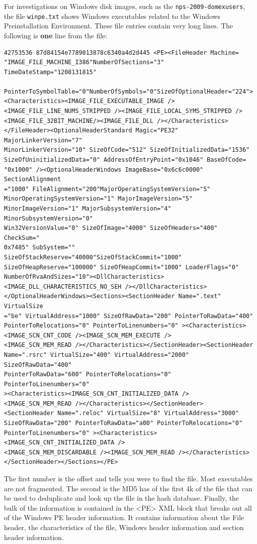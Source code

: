 For investigations on Windows disk images, such as the \texttt{nps-2009-domexusers}, the file \texttt{winpe.txt} shows Windows executables related to the Windows Preinstallation Environment. These file entries contain very long lines. The following is \textbf{one} line from the file:
\lstset{style=customfile}
\begin{lstlisting}
42753536 87d84154e7789013878c6340a4d2d445 <PE><FileHeader Machine=
"IMAGE_FILE_MACHINE_I386"NumberOfSections="3" TimeDateStamp="1208131815"
 PointerToSymbolTable="0"NumberOfSymbols="0"SizeOfOptionalHeader="224">
<Characteristics><IMAGE_FILE_EXECUTABLE_IMAGE />
<IMAGE_FILE_LINE_NUMS_STRIPPED /><IMAGE_FILE_LOCAL_SYMS_STRIPPED />
<IMAGE_FILE_32BIT_MACHINE/><IMAGE_FILE_DLL /></Characteristics>
</FileHeader><OptionalHeaderStandard Magic="PE32" MajorLinkerVersion="7" 
MinorLinkerVersion="10" SizeOfCode="512" SizeOfInitializedData="1536" 
SizeOfUninitializedData="0" AddressOfEntryPoint="0x1046" BaseOfCode=
"0x1000" /><OptionalHeaderWindows ImageBase="0x6c6c0000" SectionAlignment
="1000" FileAlignment="200"MajorOperatingSystemVersion="5" 
MinorOperatingSystemVersion="1" MajorImageVersion="5" 
MinorImageVersion="1" MajorSubsystemVersion="4" MinorSubsystemVersion="0" 
Win32VersionValue="0" SizeOfImage="4000" SizeOfHeaders="400" CheckSum="
0x7485" SubSystem="" SizeOfStackReserve="40000"SizeOfStackCommit="1000"
SizeOfHeapReserve="100000" SizeOfHeapCommit="1000" LoaderFlags="0"
NumberOfRvaAndSizes="10"><DllCharacteristics>
<IMAGE_DLL_CHARACTERISTICS_NO_SEH /></DllCharacteristics>
</OptionalHeaderWindows><Sections><SectionHeader Name=".text" VirtualSize
="be" VirtualAddress="1000" SizeOfRawData="200" PointerToRawData="400" 
PointerToRelocations="0" PointerToLinenumbers="0" ><Characteristics>
<IMAGE_SCN_CNT_CODE /><IMAGE_SCN_MEM_EXECUTE />
<IMAGE_SCN_MEM_READ /></Characteristics></SectionHeader><SectionHeader 
Name=".rsrc" VirtualSize="400" VirtualAddress="2000" SizeOfRawData="400" 
PointerToRawData="600" PointerToRelocations="0" PointerToLinenumbers="0"
><Characteristics><IMAGE_SCN_CNT_INITIALIZED_DATA />
<IMAGE_SCN_MEM_READ /></Characteristics></SectionHeader>
<SectionHeader Name=".reloc" VirtualSize="8" VirtualAddress="3000" 
SizeOfRawData="200" PointerToRawData="a00" PointerToRelocations="0" 
PointerToLinenumbers="0" ><Characteristics><IMAGE_SCN_CNT_INITIALIZED_DATA />
<IMAGE_SCN_MEM_DISCARDABLE /><IMAGE_SCN_MEM_READ /></Characteristics>
</SectionHeader></Sections></PE>
\end{lstlisting}
The first number is the offset and tells you were to find the file. Most executables are not fragmented. The second is the MD5 has of the first 4k of the file that can be used to deduplicate and look up the file in the hash database. Finally, the bulk of the information is contained in the <PE> XML block that breaks out all of the Windows PE header information. It contains information about the File header, the characteristics of the file, Windows header information and section header information.\\

